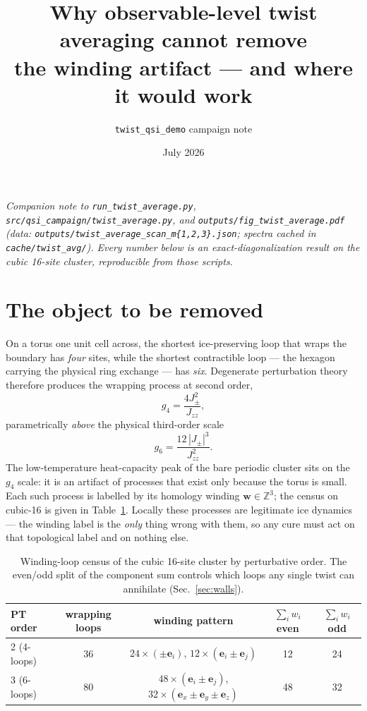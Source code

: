 \documentclass[11pt]{article}
\title{Why observable-level twist averaging cannot remove\\ the winding artifact
--- and where it would work}
\author{\texttt{twist\_qsi\_demo} campaign note}
\date{July 2026}
\newcommand{\Jpm}{J_{\pm}}
\newcommand{\Jzz}{J_{zz}}
\newcommand{\bw}{\mathbf{w}}
\newcommand{\Z}{\mathbb{Z}}
\begin{document}
\maketitle

\noindent\emph{Companion note to \texttt{run\_twist\_average.py},
\texttt{src/qsi\_campaign/twist\_average.py}, and
\texttt{outputs/fig\_twist\_average.pdf} (data:
\texttt{outputs/twist\_average\_scan\_m\{1,2,3\}.json}; spectra cached in
\texttt{cache/twist\_avg/}).  Every number below is an exact-diagonalization
result on the cubic 16-site cluster, reproducible from those scripts.}

\section{The object to be removed}

On a torus one unit cell across, the shortest ice-preserving loop that wraps
the boundary has \emph{four} sites, while the shortest contractible loop ---
the hexagon carrying the physical ring exchange --- has \emph{six}.
Degenerate perturbation theory therefore produces the wrapping process at
second order,
\begin{equation}
  g_4 = \frac{4\Jpm^2}{\Jzz},
\end{equation}
parametrically \emph{above} the physical third-order scale
\begin{equation}
  g_6 = \frac{12\,|\Jpm|^3}{\Jzz^2}.
\end{equation}
The low-temperature heat-capacity peak of the bare periodic cluster sits on
the $g_4$ scale: it is an artifact of processes that exist only because the
torus is small.  Each such process is labelled by its homology winding
$\bw\in\Z^3$; the census on cubic-16 is given in
Table~\ref{tab:census}.  Locally these processes are legitimate ice dynamics
--- the winding label is the \emph{only} thing wrong with them, so any cure
must act on that topological label and on nothing else.

\begin{table}[h]
\centering
\begin{tabular}{lcccc}
\toprule
PT order & wrapping loops & winding pattern & $\sum_i w_i$ even & $\sum_i w_i$ odd\\
\midrule
2 (4-loops) & 36 & $24\times(\pm\mathbf{e}_i)$,\; $12\times(\mathbf{e}_i\pm\mathbf{e}_j)$ & 12 & 24\\
3 (6-loops) & 80 & $48\times(\mathbf{e}_i\pm\mathbf{e}_j)$,\; $32\times(\mathbf{e}_x\pm\mathbf{e}_y\pm\mathbf{e}_z)$ & 48 & 32\\
\bottomrule
\end{tabular}
\caption{Winding-loop census of the cubic 16-site cluster by perturbative
order.  The even/odd split of the component sum controls which loops any
single twist can annihilate (Sec.~\ref{sec:walls}).}
\label{tab:census}
\end{table}
\end{document}
